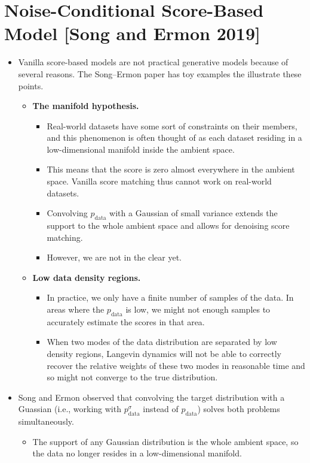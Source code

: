 \documentclass[10pt]{article}
\newcommand{\mrm}[1]{\mathrm{#1}}
\begin{document}
\section{Noise-Conditional Score-Based Model [Song and Ermon 2019]}

\begin{itemize}
  \item Vanilla score-based models are not practical generative models because of several reasons. The Song--Ermon paper has toy examples the illustrate these points.
  \begin{itemize}
    \item {\bf The manifold hypothesis.}
    \begin{itemize}
      \item Real-world datasets have some sort of constraints on their members, and this phenomenon is often thought of as each dataset residing in a low-dimensional manifold inside the ambient space. 
      
      \item This means that the score is zero almost everywhere in the ambient space. Vanilla score matching thus cannot work on real-world datasets. 
      
      \item Convolving $p_{\mrm{data}}$ with a Gaussian of small variance extends the support to the whole ambient space and allows for denoising score matching. 
      
      \item However, we are not in the clear yet.
    \end{itemize}
    
    \item {\bf Low data density regions.}
    \begin{itemize}
      \item In practice, we only have a finite number of samples of the data. In areas where the $p_{\mrm{data}}$ is low, we might not enough samples to accurately estimate the scores in that area.
      
      \item When two modes of the data distribution are separated by low density regions, Langevin dynamics will not be able to correctly recover the relative weights of these two modes in reasonable time and so might not converge to the true distribution.
    \end{itemize}
  \end{itemize}

  \item Song and Ermon observed that convolving the target distribution with a Guassian (i.e., working with $p_{\mrm{data}}^\sigma$ instead of $p_{\mrm{data}}$) solves both problems simultaneously.
  \begin{itemize}
    \item The support of any Gaussian distribution is the whole ambient space, so the data no longer resides in a low-dimensional manifold.
    

\end{itemize}
\end{itemize}
\end{document}
